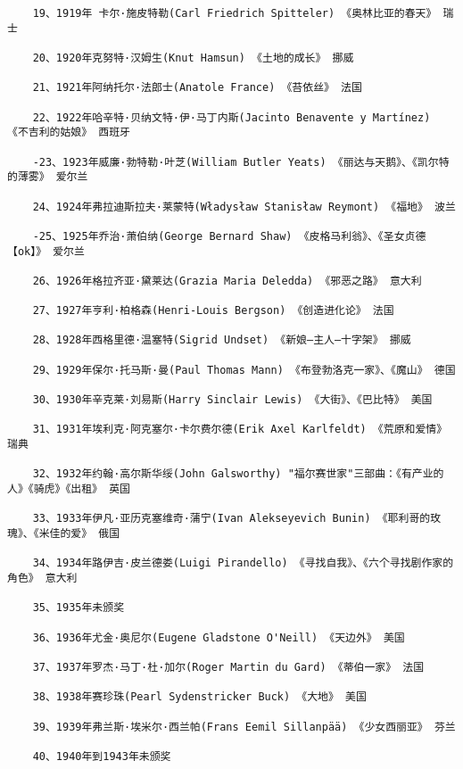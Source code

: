\documentclass[UTF8]{../../RepresentationUniverse}
\begin{document}
\begin{lstlisting}
    19、1919年 卡尔·施皮特勒(Carl Friedrich Spitteler) 《奥林比亚的春天》 瑞士
    
    20、1920年克努特·汉姆生(Knut Hamsun) 《土地的成长》 挪威
    
    21、1921年阿纳托尔·法郎士(Anatole France) 《苔依丝》 法国
    
    22、1922年哈辛特·贝纳文特·伊·马丁内斯(Jacinto Benavente y Martínez) 《不吉利的姑娘》 西班牙
    
    -23、1923年威廉·勃特勒·叶芝(William Butler Yeats) 《丽达与天鹅》、《凯尔特的薄雾》 爱尔兰
    
    24、1924年弗拉迪斯拉夫·莱蒙特(Władysław Stanisław Reymont) 《福地》 波兰
    
    -25、1925年乔治·萧伯纳(George Bernard Shaw) 《皮格马利翁》、《圣女贞德【ok】》 爱尔兰
    
    26、1926年格拉齐亚·黛莱达(Grazia Maria Deledda) 《邪恶之路》 意大利
    
    27、1927年亨利·柏格森(Henri-Louis Bergson) 《创造进化论》 法国
    
    28、1928年西格里德·温塞特(Sigrid Undset) 《新娘—主人—十字架》 挪威
    
    29、1929年保尔·托马斯·曼(Paul Thomas Mann) 《布登勃洛克一家》、《魔山》 德国
    
    30、1930年辛克莱·刘易斯(Harry Sinclair Lewis) 《大街》、《巴比特》 美国
    
    31、1931年埃利克·阿克塞尔·卡尔费尔德(Erik Axel Karlfeldt) 《荒原和爱情》 瑞典
    
    32、1932年约翰·高尔斯华绥(John Galsworthy) "福尔赛世家"三部曲：《有产业的人》《骑虎》《出租》 英国
    
    33、1933年伊凡·亚历克塞维奇·蒲宁(Ivan Alekseyevich Bunin) 《耶利哥的玫瑰》、《米佳的爱》 俄国
    
    34、1934年路伊吉·皮兰德娄(Luigi Pirandello) 《寻找自我》、《六个寻找剧作家的角色》 意大利
    
    35、1935年未颁奖
    
    36、1936年尤金·奥尼尔(Eugene Gladstone O'Neill) 《天边外》 美国
    
    37、1937年罗杰·马丁·杜·加尔(Roger Martin du Gard) 《蒂伯一家》 法国
    
    38、1938年赛珍珠(Pearl Sydenstricker Buck) 《大地》 美国
    
    39、1939年弗兰斯·埃米尔·西兰帕(Frans Eemil Sillanpää) 《少女西丽亚》 芬兰
    
    40、1940年到1943年未颁奖
    

\end{lstlisting}
\end{document}
